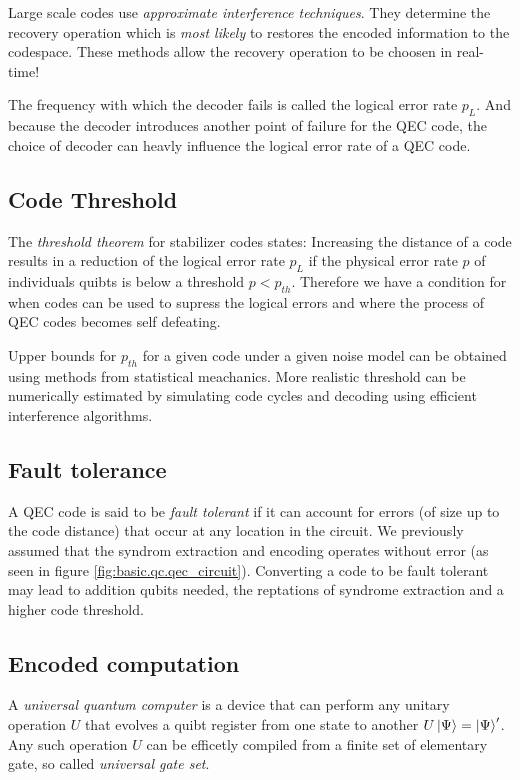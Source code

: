 Large scale codes use \textit{approximate interference techniques}.
They determine the recovery operation which is \textit{most likely} to restores the encoded information to the codespace.
These methods allow the recovery operation to be choosen in real-time! \cite{QECintro}

The frequency with which the decoder fails is called the logical error rate $p_L$. 
And because the decoder introduces another point of failure for the QEC code, the choice of decoder can heavly influence the logical error rate of a QEC code.  \cite{QECintro}


\subsection{Code Threshold}
The \textit{threshold theorem} for stabilizer codes states:
Increasing the distance of a code results in a reduction of the logical error rate $p_L$ 
if the physical error rate $p$ of individuals quibts is below a threshold $p<p_{th}$.
Therefore we have a condition for when codes can be used to supress the logical errors and where the process of QEC codes becomes self defeating. \cite{QECintro}

Upper bounds for $p_{th}$ for a given code under a given noise model can be obtained using methods from statistical meachanics.
More realistic threshold can be numerically estimated by simulating code cycles and decoding using efficient interference algorithms. \cite{QECintro}


\subsection{Fault tolerance}
A QEC code is said to be \textit{fault tolerant} if it can account for errors (of size up to the code distance) that occur at any location in the circuit.
We previously assumed that the syndrom extraction and encoding operates without error (as seen in figure \ref{fig:basic.qc.qec_circuit}).
Converting a code to be fault tolerant may lead to addition qubits needed, the reptations of syndrome extraction and a higher code threshold. \cite{QECintro}


\subsection{Encoded computation}
A \textit{universal quantum computer} is a device that can perform any unitary operation $U$ that evolves a quibt register from one state to another $U\ket{\Psi} = \ket{\Psi}'$.
Any such operation $U$ can be efficetly compiled from a finite set of elementary gate, so called \textit{universal gate set}. \cite{QECintro}

